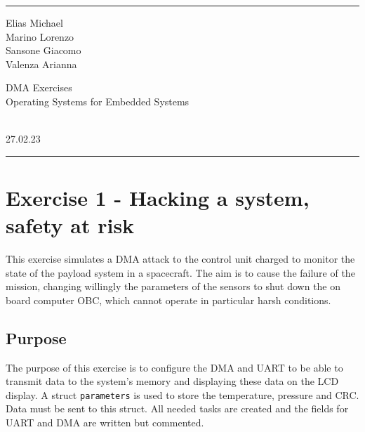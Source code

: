 \documentclass[a4paper]{article}
\begin{document}

\fancyhead[C]{}
\hrule \medskip %
\begin{minipage}{0.295\textwidth} 
\raggedright
\footnotesize
Elias Michael\hfill\\   
Marino Lorenzo\hfill\\
Sansone Giacomo\hfill\\
Valenza Arianna

\end{minipage}
\begin{minipage}{0.4\textwidth} 
\centering 
\large 
DMA Exercises\\ 
\normalsize 
Operating Systems for Embedded Systems\\ 
\end{minipage}
\begin{minipage}{0.295\textwidth} 
\raggedleft
\\27.02.23\hfill\\
\end{minipage}
\medskip\hrule 
\bigskip


\section{Exercise 1 - Hacking a system, safety at risk}
This exercise simulates a DMA attack to the control unit charged to monitor the state of the payload system in a spacecraft. The aim is to cause the failure of the mission, changing willingly the parameters of the sensors to shut down the on board computer OBC, which cannot operate in particular harsh conditions.
\subsection{Purpose}
The purpose of this exercise is to configure the DMA and UART to be able to transmit data to the system’s memory and displaying these data on the LCD display.
A struct \texttt{parameters} is used to store the temperature, pressure and CRC. Data must be sent to this struct. All needed tasks are created and the fields for UART and DMA are written but commented.


\end{document}
